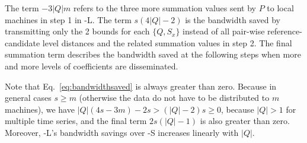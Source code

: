 \noindent
The term $-3|Q|m$ refers to the three more summation values
sent by $P$ to local machines in step 1 in \MSWave-L{}. The term
$s(4|Q|-2)$ is the bandwidth saved by transmitting only the 2 bounds
for each $\{Q, S_x\}$ instead of all pair-wise reference-candidate
level distances and the related summation values in step 2. The final
summation term describes the bandwidth saved at the following steps
when more and more levels of coefficients are disseminated.

Note that Eq.~\eqref{eq:bandwidthsaved} is always
greater than zero.  Because in general cases $s \geq m$ (otherwise the
data do not have to be distributed to $m$ machines), we have
$|Q|(4s-3m)-2s>(|Q|-2)s \geq 0$, because $|Q|>1$ for multiple
time series, and the final term $2s(|Q|-1)$ is also greater than zero.
Moreover, \MSWave-L{}'s bandwidth savings over \MSWave-S{} increases
linearly with $|Q|$.



